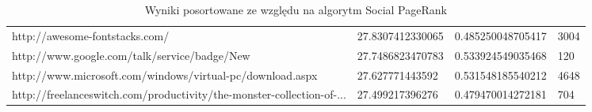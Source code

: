 \begin{sidewaystable}[htb]
\begin{tabular}{ | p{14cm} | l | l | l| }
 http://awesome-fontstacks.com/                                                                     & 27.8307412330065 & 0.485250048705417 &                                    3004 \\
 http://www.google.com/talk/service/badge/New                                                       & 27.7486823470783 & 0.533924549035468 &                                     120 \\
 http://www.microsoft.com/windows/virtual-pc/download.aspx                                          &  27.627771443592 & 0.531548185540212 &                                    4648 \\
 http://freelanceswitch.com/productivity/the-monster-collection-of-... &  27.499217396276 & 0.479470014272181 &                                     704 \\
\hline
\end{tabular}
  \caption{Wyniki posortowane ze względu na algorytm Social PageRank }
  \label{tab:social_page_wyniki_sorted}
\end{sidewaystable}




